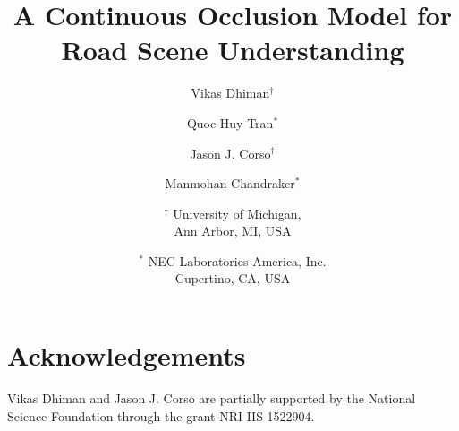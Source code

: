 \documentclass[10pt,twocolumn,letterpaper]{article}
\begin{document}
\title{A Continuous Occlusion Model for Road Scene Understanding}

\author{Vikas Dhiman$^\dagger$
\and
Quoc-Huy Tran$^*$
\and
Jason J. Corso$^\dagger$
\and
Manmohan Chandraker$^*$
\and
$^\dagger$ University of Michigan,\\
Ann Arbor, MI, USA
\and
$^*$ NEC Laboratories America, Inc.\\
Cupertino, CA, USA
}

\maketitle






%





\section*{Acknowledgements}
Vikas Dhiman and Jason J. Corso are partially supported by the National Science Foundation through the grant NRI IIS 1522904.





{\small


}
\end{document}
